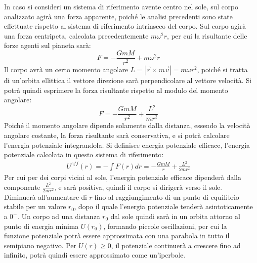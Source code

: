 \documentclass{article}
\numberwithin{equation}{subsection}
\begin{document}
In caso si consideri un sistema di riferimento avente centro nel sole, sul corpo analizzato agirà una forza apparente, poiché le analisi 
precedenti sono state effettuate rispetto al sistema di riferimento intrinseco del corpo. Sul corpo agirà una forza centripeta, calcolata 
precedentemente $m\omega^2r$, per cui la risultante delle forze agenti sul pianeta sarà:
\begin{equation}
    F=-\displaystyle\frac{GmM}{r^2}+m\omega^2r
\end{equation}
Il corpo avrà un certo momento angolare $L=|\vec{r}\times m\vec{v}|=m\omega r^2$, poiché si tratta di un'orbita ellittica il vettore direzione 
sarà perpendicolare al vettore velocità. Si potrà quindi esprimere la forza risultante rispetto al modulo del momento angolare:
\begin{equation}
    F=-\displaystyle\frac{GmM}{r^2}+\frac{L^2}{mr^3}
\end{equation}
Poiché il momento angolare dipende solamente dalla distanza, essendo la velocità angolare costante, la forza risultante sarà conservativa, e si potrà 
calcolare l'energia potenziale integrandola. Si definisce energia potenziale efficace, l'energia potenziale calcolata in questo sistema di riferimento:
\begin{eqnarray}
    U^{eff}(r)=-\int F(r)dr=-\displaystyle\frac{GmM}{r}+\frac{L^2}{2mr^2}
\end{eqnarray}
Per cui per dei corpi vicini al sole, l'energia potenziale efficace dipenderà dalla componente $\displaystyle\frac{L^2}{2mr^2}$, e sarà positiva, quindi 
il corpo si dirigerà verso il sole. Diminuerà all'aumentare di $r$ fino al raggiungimento di un punto di equilibrio stabile per un valore 
$r_0$, dopo il quale l'energia potenziale tenderà asintoticamente a $0^-$. Un corpo ad una distanza $r_0$ dal sole quindi sarà in un orbita attorno al 
punto di energia minima $U(r_0)$, formando piccole oscillazioni, per cui la funzione potenziale potrà essere approssimata con una parabola in 
tutto il semipiano negativo. Per $U(r)\geq0$, il potenziale continuerà a crescere fino ad infinito, potrà quindi essere approssimato come un'iperbole. 

\begin{center}
\end{center}
\end{document}
